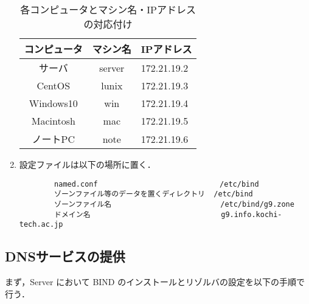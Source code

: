 \documentclass[a4j,titlepage]{jarticle}
\begin{document}
\begin{enumerate}
\begin{table}[htbp]
\caption{各コンピュータとマシン名・IPアドレスの対応付け}
\label{tab:dnsserver}
\begin{center}
\begin{tabular}{ccl}
  \hline
  コンピュータ & マシン名 & IPアドレス \\ \hline \hline
  サーバ & server & 172.21.19.2 \\ \hline
  CentOS & lunix & 172.21.19.3 \\ \hline
  Windows10 & win & 172.21.19.4 \\ \hline
  Macintosh & mac & 172.21.19.5 \\ \hline
  ノートPC & note & 172.21.19.6 \\ 
  \hline
\end{tabular}
\end{center}
\end{table}

\item 設定ファイルは以下の場所に置く．

  \begin{center}
    \begin{screen}
\begin{verbatim}
        named.conf                            /etc/bind
        ゾーンファイル等のデータを置くディレクトリ  /etc/bind
        ゾーンファイル名                         /etc/bind/g9.zone
        ドメイン名                              g9.info.kochi-tech.ac.jp
\end{verbatim}
    \end{screen}
  \end{center}
  

\end{enumerate}
  
  \subsection{DNSサービスの提供}
まず，Server において BIND のインストールとリゾルバの設定を以下の手順で行う．
\end{document}
